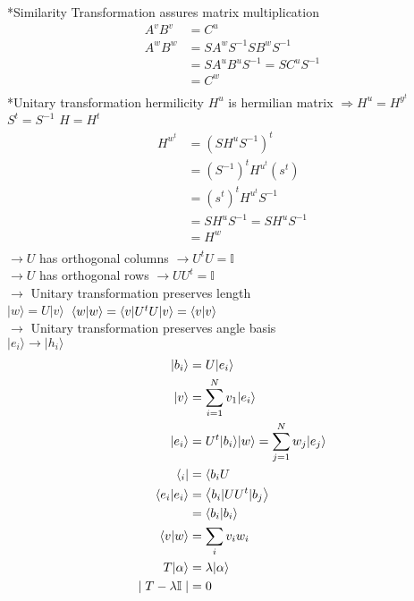 \documentclass{article}
\begin{document}
*Similarity Transformation assures matrix multiplication
\begin{align*}
A^{v}B^{v}&=C^{u}\\
A^{w}B^{w}&=SA^{w}S^{-1}SB^{w}S^{-1}\\
&=SA^{u}B^{u}S^{-1}=SC^{u}S^{-1}\\
&=C^{w}\\
\end{align*}
*Unitary transformation hermilicity $H^{u}$ is hermilian matrix $\Rightarrow H^{u}=H^{y^{t}}$ \hspace{1cm} $S^{t}=S^{-1}$ \hspace{1cm} $H=H^{t}$
\begin{align*}
H^{w^{t}}&=\left(SH^{u}S^{-1}\right)^{t}\\
&=(S^{-1})^{t}H^{u^{t}}(s^{t})\\
&=(s^{t})^{t}H^{u^{t}}S^{-1}\\
&=SH^{u}S^{-1}=SH^{u}S^{-1}\\
&=H^{w}\\
\end{align*}
\newpage
$\rightarrow U$ has orthogonal columns $\rightarrow U^{t}U=\mathbb{I}$\\

$\rightarrow U$ has orthogonal rows $\rightarrow UU^{t}=\mathbb{I}$\\

$\rightarrow$ Unitary transformation preserves length\\

$|w\rangle=U|v\rangle$\
$\ev{w|w}=\ev{v|U^{t}U|v}=\ev{v|v}$\\

$\rightarrow$ Unitary transformation preserves angle basis\\
$|e_{i}\rangle \rightarrow|h_{i}\rangle$\\
\begin{align*}
|b_{i}\rangle &=U|e_{i}\rangle\\
|v\rangle&=\sum_{i=1}^{N}v_{1}|e_{i}\rangle\\
|e_{i}\rangle&=U^{t}|b_{i}\rangle|w\rangle =\sum_{j=1}^{N}w_{j}|e_{j}\rangle\\
\langle_{i}|&=\langle b_{i}U\\
\ev{e_{i}|e_{i}}&=\ev{b_{i}|UU^{t}|b_{j}}\\
&= \ev{b_{i}|b_{i}}\\
\ev{v|w}&=\sum_{i}v_{i}w_{i}\\
T|\alpha\rangle &=\lambda|\alpha\rangle\\
\mid T-\lambda \mathbb{I} \mid &=0
\end{align*}
\end{document}
